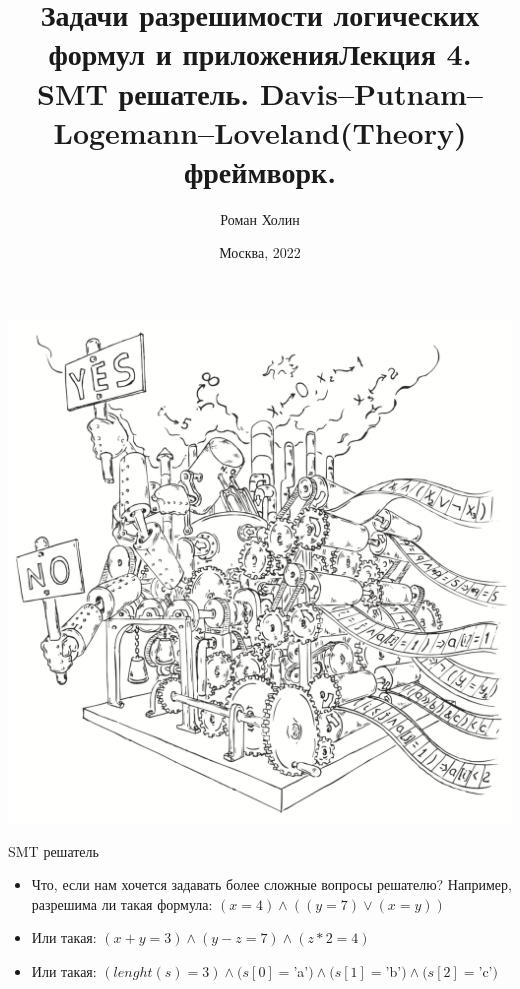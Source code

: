 \documentclass{beamer}
\begin{document}
\title{Задачи разрешимости логических формул и приложения\newline Лекция 4. SMT решатель. Davis–Putnam–Logemann–Loveland(Theory) фреймворк.}
\author{Роман Холин}
\date{Москва, 2022}

\begin{frame}
\includegraphics[scale=0.5]{../decision-procedure.png}
\end{frame}

\frame{\titlepage}

\begin{frame}{SMT решатель}
\begin{itemize}
\item Что, если нам хочется задавать более сложные вопросы решателю? Например, разрешима ли такая формула:
$(x = 4) \wedge ((y = 7) \vee (x = y))$
\item Или такая: $(x + y = 3) \wedge (y - z = 7) \wedge (z * 2 = 4)$
\item Или такая: $(lenght(s) = 3) \wedge (s[0] = $'a'$) \wedge (s[1] = $'b'$) \wedge (s[2] = $'c'$)$
\end{itemize}
\end{frame}
\end{document}
